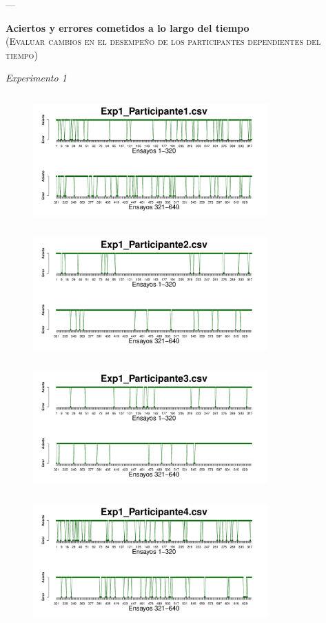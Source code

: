 \documentclass[a4paper ]{article}
\begin{document}
---
\vspace{3mm}
\begin{center}
{\LARGE \textbf{Aciertos y errores cometidos a lo largo del tiempo}}\\
{\small \textsc{(Evaluar cambios en el desempeño de los participantes dependientes del tiempo)}}\\
\smallskip
\end{center}
\begin{center}
{\LARGE \textit{Experimento 1}}\\
\end{center}
\vspace{3mm}
\begin{figure}[th]
\centering
\includegraphics[width=9cm, height=5cm]{Figures/Success_Exp1_P1} \includegraphics[width=9cm, height=5cm]{Figures/Success_Exp1_P2} 
\includegraphics[width=9cm, height=5cm]{Figures/Success_Exp1_P3} \includegraphics[width=9cm, height=5cm]{Figures/Success_Exp1_P4} 

\end{figure}
\end{document}
